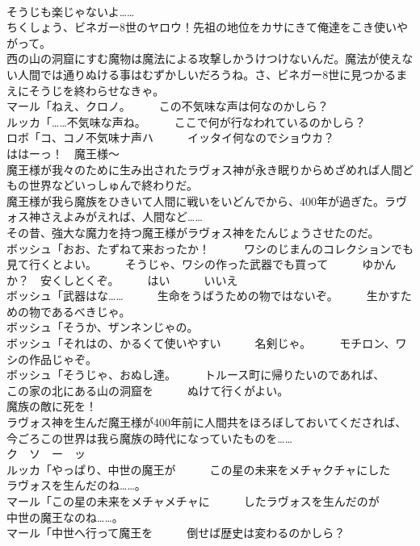 \documentclass[8pt]{extreport}
\begin{document}
\begin{CJK}{UTF8}{min}
\\	そうじも楽じゃないよ……	
\\	ちくしょう、ビネガー8世のヤロウ！先祖の地位をカサにきて俺達をこき使いやがって。	
\\	西の山の洞窟にすむ魔物は魔法による攻撃しかうけつけないんだ。魔法が使えない人間では通りぬける事はむずかしいだろうね。さ、ビネガー8世に見つかるまえにそうじを終わらせなきゃ。	
\\	マール「ねえ、クロノ。　　　この不気味な声は何なのかしら？	
\\	ルッカ「……不気味な声ね。　　　ここで何が行なわれているのかしら？	
\\	ロボ「コ、コノ不気味ナ声ハ　　　イッタイ何なのでショウカ？	
\\	ははーっ！　魔王様～	
\\	魔王様が我々のために生み出されたラヴォス神が永き眠りからめざめれば人間どもの世界などいっしゅんで終わりだ。	
\\	魔王様が我ら魔族をひきいて人間に戦いをいどんでから、400年が過ぎた。ラヴォス神さえよみがえれば、人間など……	
\\	その昔、強大な魔力を持つ魔王様がラヴォス神をたんじょうさせたのだ。	
\\	ボッシュ「おお、たずねて来おったか！　　　ワシのじまんのコレクションでも　　　見て行くとよい。　　　そうじゃ、ワシの作った武器でも買って　　　ゆかんか？　安くしとくぞ。　　　はい　　　いいえ	
\\	ボッシュ「武器はな……　　　生命をうばうための物ではないぞ。　　　生かすための物であるべきじゃ。	
\\	ボッシュ「そうか、ザンネンじゃの。	
\\	ボッシュ「それはの、かるくて使いやすい　　　名剣じゃ。　　　モチロン、ワシの作品じゃぞ。	
\\	ボッシュ「そうじゃ、おぬし達。　　　トルース町に帰りたいのであれば、　　　この家の北にある山の洞窟を　　　ぬけて行くがよい。	
\\	魔族の敵に死を！	
\\	ラヴォス神を生んだ魔王様が400年前に人間共をほろぼしておいてくだされば、今ごろこの世界は我ら魔族の時代になっていたものを……	
\\	ク　ソ　ー　ッ　
\\	ルッカ「やっぱり、中世の魔王が　　　この星の未来をメチャクチャにした　　　ラヴォスを生んだのね……。	
\\	マール「この星の未来をメチャメチャに　　　したラヴォスを生んだのが　　　中世の魔王なのね……。	
\\	マール「中世へ行って魔王を　　　倒せば歴史は変わるのかしら？	

\end{CJK}
\end{document}
